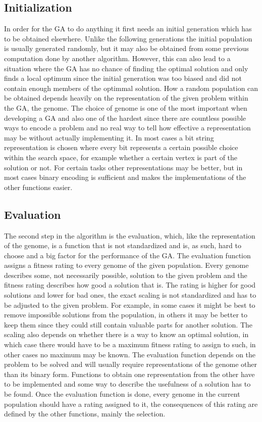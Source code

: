 \subsection{Initialization}
\label{sec:initialization}

In order for the GA to do anything it first needs an initial generation which has to be obtained elsewhere. Unlike the following generations the initial population is usually generated randomly, but it may also be obtained from some previous computation done by another algorithm. However, this can also lead to a situation where the GA has no chance of finding the optimal solution and only finds a local optimum since the initial generation was too biased and did not contain enough members of the optimmal solution.
How a random population can be obtained depends heavily on the representation of the given problem within the GA, the genome. The choice of genome is one of the most important when developing a GA and also one of the hardest since there are countless possible ways to encode a problem and no real way to tell how effective a representation may be without actually implementing it. In most cases a bit string representation is chosen where every bit represents a certain possible choice within the search space, for example whether a certain vertex is part of the solution or not. For certain tasks other representations may be better, but in most cases binary encoding is sufficient and makes the implementations of the other functions easier.

\subsection{Evaluation}
\label{sec:evaluation}

The second step in the algorithm is the evaluation, which, like the representation of the genome, is a function that is not standardized and is, as such, hard to choose and a big factor for the performance of the GA. The evaluation function assigns a fitness rating to every genome of the given population. Every genome describes some, not necessarily possible, solution to the given problem and the fitness rating describes how good a solution that is. The rating is higher for good solutions and lower for bad ones, the exact scaling is not standardized and has to be adjusted to the given problem. For example, in some cases it might be best to remove impossible solutions from the population, in others it may be better to keep them since they could still contain valuable parts for another solution. The scaling also depends on whether there is a way to know an optimal solution, in which case there would have to be a maximum fitness rating to assign to such, in other cases no maximum may be known.
The evaluation function depends on the problem to be solved and will usually require representations of the genome other than its binary form. Functions to obtain one representation from the other have to be implemented and some way to describe the usefulness of a solution has to be found.
Once the evaluation function is done, every genome in the current population should have a rating assigned to it, the consequences of this rating are defined by the other functions, mainly the selection.

